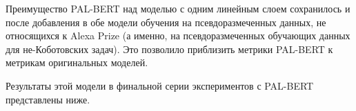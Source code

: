 Преимущество PAL-BERT над моделью с одним линейным слоем сохранилось и после добавления в обе модели обучения на псевдоразмеченных данных, не относящихся к Alexa Prize (а именно, на псевдоразмеченных обучающих данных для не-Коботовских задач). Это позволило приблизить метрики PAL-BERT к метрикам оригинальных моделей.

Результаты этой модели в финальной серии экспериментов с PAL-BERT представлены ниже.


\begin{table}[htbp]
\centering
\caption {Точность (взвешенный-F1) для оценки моделей в третьей серии экспериментов. Для не-Коботовских задач при оценке используются оригинальные тестовые наборы данных, для коботовских - тестовая часть разбиения данных.}
\label{mtldream:5}
\end{table}
